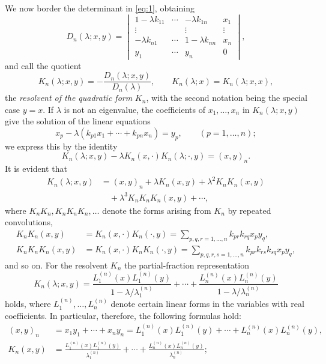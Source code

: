 \documentclass[b5paper,twoside]{article}
\newcommand{\originalpage}[1]{\phantomsection\label{origpage:#1}}
\begin{document}
We now border the determinant in \eqref{eq:1}, obtaining
\[
  D_n(\lambda;x,y)=
  \begin{vmatrix}
    1-\lambda k_{11} & \cdots & -\lambda k_{1n} & x_1\\
    \vdots & & \vdots & \vdots\\
    -\lambda k_{n1} & \cdots & 1-\lambda k_{nn} & x_n\\
    y_1 & \cdots & y_n & 0
  \end{vmatrix},
\]
and call the quotient
\[
  K_n(\lambda;x,y)=-\frac{D_n(\lambda;x,y)}{D_n(\lambda)},
  \qquad
  K_n(\lambda;x)=K_n(\lambda;x,x),
\]
the \emph{resolvent of the quadratic form} $K_n$, with the second notation
being the special case $y=x$. If
$\lambda$ is not an eigenvalue, the coefficients of $x_1,\ldots,x_n$ in
$K_n(\lambda;x,y)$ give the solution of the linear equations
\[
  x_p-\lambda(k_{p1}x_1+\cdots+k_{pn}x_n)=y_p,
  \qquad (p=1,\ldots,n);
\]
we express this by the identity
\[
  K_n(\lambda;x,y)
  -\lambda K_n(x,\mathord{\cdot})K_n(\lambda;\mathord{\cdot},y)
  =(x,y)_n.
\]
It is evident that
\begin{equation}
\tag{2}\label{eq:2}
\begin{aligned}
  K_n(\lambda;x,y)
  &=(x,y)_n+\lambda K_n(x,y)+\lambda^2K_nK_n(x,y)\\
  &\quad+\lambda^3K_nK_nK_n(x,y)+\cdots,
\end{aligned}
\end{equation}
where $K_nK_n,K_nK_nK_n,\ldots$ denote the forms arising from $K_n$
by repeated convolutions,
\begin{align*}
  K_nK_n(x,y)
    &=K_n(x,\mathord{\cdot})K_n(\mathord{\cdot},y)
      =\sum_{p,q,r=1,\ldots,n}k_{pr}k_{rq}x_p y_q,\\
  K_nK_nK_n(x,y)
    &=K_n(x,\mathord{\cdot})K_nK_n(\mathord{\cdot},y)
      =\sum_{p,q,r,s=1,\ldots,n}k_{pr}k_{rs}k_{sq}x_p y_q,
\end{align*}
and so on.  For the resolvent $K_n$ the partial-fraction representation
\originalpage{161}
\begin{equation}
\tag{3}\label{eq:3}
  K_n(\lambda;x,y)
  =\frac{L_1^{(n)}(x)L_1^{(n)}(y)}{1-\lambda/\lambda_1^{(n)}}
   +\cdots+
   \frac{L_n^{(n)}(x)L_n^{(n)}(y)}{1-\lambda/\lambda_n^{(n)}}
\end{equation}
holds, where $L_1^{(n)},\ldots,L_n^{(n)}$ denote certain linear forms in
the variables with real coefficients.  In particular, therefore, the
following formulas hold:
\begin{equation}
\tag{4}\label{eq:4}
\begin{aligned}
  (x,y)_n
    &=x_1y_1+\cdots+x_ny_n
      =L_1^{(n)}(x)L_1^{(n)}(y)+\cdots+L_n^{(n)}(x)L_n^{(n)}(y),\\
  K_n(x,y)
    &=\frac{L_1^{(n)}(x)L_1^{(n)}(y)}{\lambda_1^{(n)}}
      +\cdots+
      \frac{L_n^{(n)}(x)L_n^{(n)}(y)}{\lambda_n^{(n)}};
\end{aligned}
\end{equation}
\end{document}
